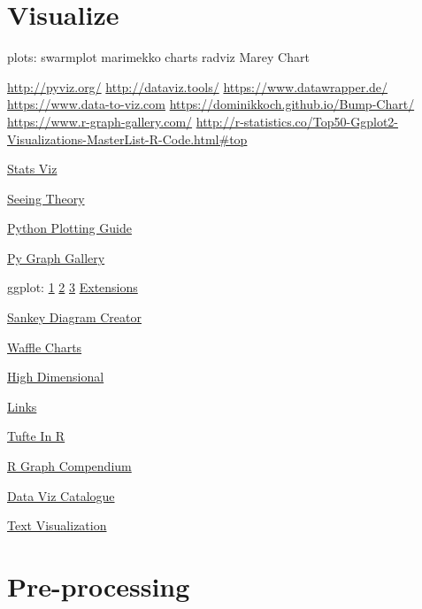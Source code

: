 \documentclass[]{book}
\begin{document}
\hypertarget{visualize}{%
\section{Visualize}\label{visualize}}

plots: swarmplot \textbar{} marimekko charts \textbar{} radviz \textbar{} Marey Chart

\url{http://pyviz.org/} \url{http://dataviz.tools/} \url{https://www.datawrapper.de/} \url{https://www.data-to-viz.com} \url{https://dominikkoch.github.io/Bump-Chart/} \url{https://www.r-graph-gallery.com/} \url{http://r-statistics.co/Top50-Ggplot2-Visualizations-MasterList-R-Code.html\#top}

\href{http://emilkirkegaard.dk/understanding_statistics/}{Stats Viz}

\href{http://students.brown.edu/seeing-theory/}{Seeing Theory}

\href{http://pythonplot.com/}{Python Plotting Guide}

\href{https://python-graph-gallery.com}{Py Graph Gallery}

ggplot: \href{https://www.pitt.edu/~naraehan/presentation/Graphs_and_Plots_using_Plotly.html}{1} \href{https://plot.ly/python/table/}{2} \href{https://plot.ly/python/html-reports/}{3} \href{http://www.ggplot2-exts.org/gallery/}{Extensions}

\href{http://sankeymatic.com}{Sankey Diagram Creator}

\href{https://nsaunders.wordpress.com/2017/09/08/infographic-style-charts-using-the-r-waffle-package/}{Waffle Charts}

\href{https://research.googleblog.com/2016/12/open-sourcing-embedding-projector-tool.html}{High Dimensional}

\href{http://www.thehackerwithin.org/swinburne/links.html}{Links}

\href{http://motioninsocial.com/tufte/}{Tufte In R}

\href{http://shinyapps.org/apps/RGraphCompendium/index.php}{R Graph Compendium}

\href{http://www.datavizcatalogue.com/index.html}{Data Viz Catalogue}

\href{http://textvis.lnu.se/}{Text Visualization}

\hypertarget{pre-processing}{%
\section{Pre-processing}\label{pre-processing}}
\end{document}
